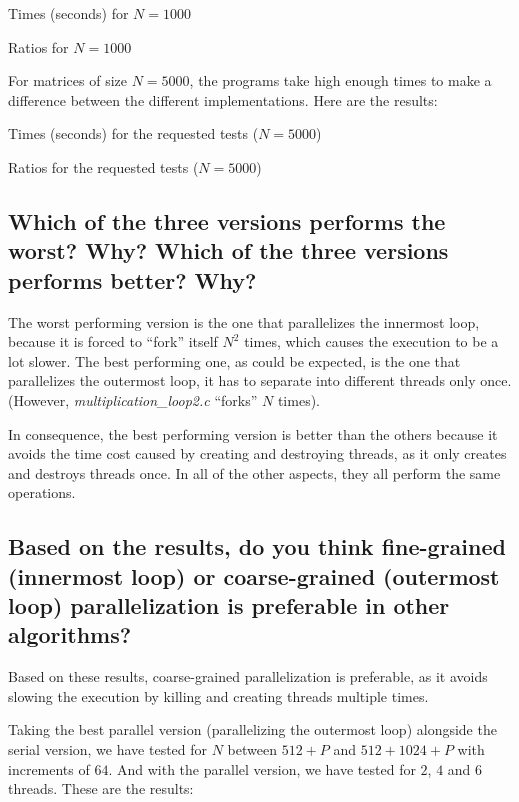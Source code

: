 \documentclass{article}
\newcommand{\question}[1]{\subsection{#1}}
\begin{document}
\begin{table}[h]
    
    \centering
    \caption{Times (seconds) for $N=1000$}
\end{table}

\begin{table}[h]
    
    \centering
    \caption{Ratios for $N=1000$}
\end{table}

For matrices of size $N=5000$, the programs take high enough times to make a difference between the different implementations. Here are the results:

\begin{table}[!h]
    
    \centering
    \caption{Times (seconds) for the requested tests ($N=5000$)}
    \label{5000_times}
\end{table}

\begin{table}[!h]
    
    \centering
    \caption{Ratios for the requested tests ($N=5000$)}
    \label{5000_ratios}
\end{table}

\question{ Which of the three versions performs the worst? Why? Which of the three versions performs better? Why?}

The worst performing version is the one that parallelizes the innermost loop, because it is forced to ``fork'' itself $N^2$ times, which causes the execution to be a lot slower. The best performing one, as could be expected, is the one that parallelizes the outermost loop, it has to separate into different threads only once. (However, \emph{multiplication\_loop2.c} ``forks'' $N$ times).

In consequence, the best performing version is better than the others because it avoids the time cost caused by creating and destroying threads, as it only creates and destroys threads once. In all of the other aspects, they all perform the same operations.

\question{Based on the results, do you think fine-grained (innermost loop) or coarse-grained (outermost loop) parallelization is preferable in other algorithms?}

Based on these results, coarse-grained parallelization is preferable, as it avoids slowing the execution by killing and creating threads multiple times. 


Taking the best parallel version (parallelizing the outermost loop) alongside the serial version, we have tested for $N$ between $512+P$ and $512+1024+P$ with increments of $64$. And with the parallel version, we have tested for $2$, $4$ and $6$ threads. These are the results: 
\end{document}
